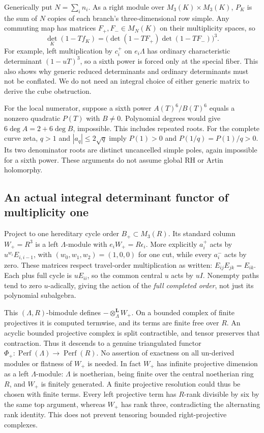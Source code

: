 \documentclass[11pt]{article}
\theoremstyle{definition}\newtheorem{definition}[theorem]{Definition}
\theoremstyle{remark}\newtheorem{remark}[theorem]{Remark}
\begin{document}
Generically put $N=\sum_i n_i$. As a right module over $M_3(K)\times M_3(K)$, $P_K$ is the sum of $N$ copies of each branch's three-dimensional row simple. Any commuting map has matrices $F_+,F_-\in M_N(K)$ on their multiplicity spaces, so
\[
 \det_K(1-Tf_K)=\bigl(\det(1-TF_+)\det(1-TF_-)\bigr)^3.
\]
For example, left multiplication by $c_i^+$ on $e_i\Lambda$ has ordinary characteristic determinant $(1-uT)^3$, so a sixth power is forced only at the special fiber. This also shows why generic reduced determinants and ordinary determinants must not be conflated. We do not need an integral choice of either generic matrix to derive the cube obstruction.

For the local numerator, suppose a sixth power $A(T)^6/B(T)^6$ equals a nonzero quadratic $P(T)$ with $B\ne0$. Polynomial degrees would give $6\deg A=2+6\deg B$, impossible. This includes repeated roots. For the complete curve zeta, $q>1$ and $|a_q|\le2\sqrt q$ imply $P(1)>0$ and $P(1/q)=P(1)/q>0$. Its two denominator roots are distinct uncancelled simple poles, again impossible for a sixth power. These arguments do not assume global RH or Artin holomorphy.

\subsection{An actual integral determinant functor of multiplicity one}
Project to one hereditary cycle order $B_+\subset M_3(R)$. Its standard column $W_+=R^3$ is a left $\Lambda$-module with $e_iW_+=R\epsilon_i$. More explicitly $a_i^+$ acts by $u^{w_i}E_{i,i-1}$, with $(w_0,w_1,w_2)=(1,0,0)$ for one cut, while every $a_i^-$ acts by zero. These matrices respect travel-order multiplication as written: $E_{ij}E_{jk}=E_{ik}$. Each plus full cycle is $uE_{ii}$, so the common central $u$ acts by $uI$. Nonempty paths tend to zero $u$-adically, giving the action of the \emph{full completed order}, not just its polynomial subalgebra.

This $(\Lambda,R)$-bimodule defines $-\otimes_\Lambda^{\mathbf L}W_+$. On a bounded complex of finite projectives it is computed termwise, and its terms are finite free over $R$. An acyclic bounded projective complex is split contractible, and tensor preserves that contraction. Thus it descends to a genuine triangulated functor $\Phi_+:\operatorname{Perf}(\Lambda)\to\operatorname{Perf}(R)$. No assertion of exactness on all un-derived modules or flatness of $W_+$ is needed. In fact $W_+$ has infinite projective dimension as a left $\Lambda$-module: $\Lambda$ is noetherian, being finite over the central noetherian ring $R$, and $W_+$ is finitely generated. A finite projective resolution could thus be chosen with finite terms. Every left projective term has $R$-rank divisible by six by the same top argument, whereas $W_+$ has rank three, contradicting the alternating rank identity. This does not prevent tensoring bounded right-projective complexes.
\end{document}
